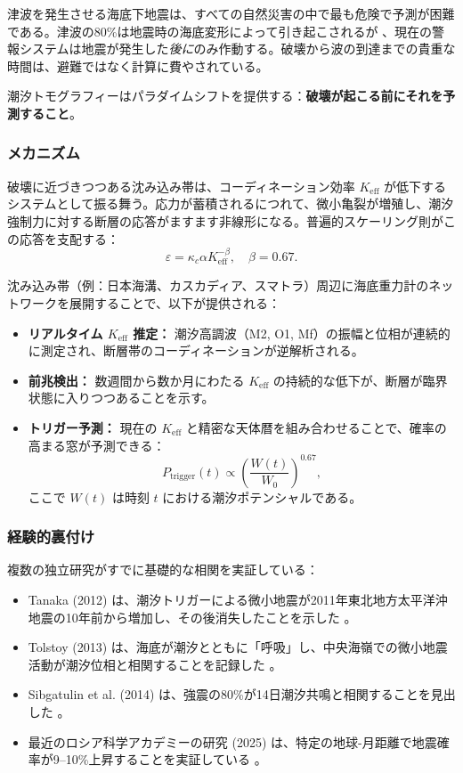 \documentclass[12pt,a4paper]{article}
\theoremstyle{remark}
\begin{document}
	津波を発生させる海底下地震は、すべての自然災害の中で最も危険で予測が困難である。津波の80\%は地震時の海底変形によって引き起こされるが \cite{NOAA2024, USGS2024}、現在の警報システムは地震が発生した\textit{後に}のみ作動する。破壊から波の到達までの貴重な時間は、避難ではなく計算に費やされている。
	
	潮汐トモグラフィーはパラダイムシフトを提供する：\textbf{破壊が起こる前にそれを予測すること}。
	
	\subsubsection{メカニズム}
	
	破壊に近づきつつある沈み込み帯は、コーディネーション効率 \(K_{\mathrm{eff}}\) が低下するシステムとして振る舞う。応力が蓄積されるにつれて、微小亀裂が増殖し、潮汐強制力に対する断層の応答がますます非線形になる。普遍的スケーリング則がこの応答を支配する：
	\[
	\varepsilon = \kappa_c \alpha K_{\mathrm{eff}}^{-\beta}, \quad \beta = 0.67.
	\]
	
	沈み込み帯（例：日本海溝、カスカディア、スマトラ）周辺に海底重力計のネットワークを展開することで、以下が提供される：
	\begin{itemize}
		\item \textbf{リアルタイム \(K_{\mathrm{eff}}\) 推定：} 潮汐高調波（M2, O1, Mf）の振幅と位相が連続的に測定され、断層帯のコーディネーションが逆解析される。
		\item \textbf{前兆検出：} 数週間から数か月にわたる \(K_{\mathrm{eff}}\) の持続的な低下が、断層が臨界状態に入りつつあることを示す。
		\item \textbf{トリガー予測：} 現在の \(K_{\mathrm{eff}}\) と精密な天体暦を組み合わせることで、確率の高まる窓が予測できる：
		\[
		P_{\text{trigger}}(t) \propto \left( \frac{W(t)}{W_0} \right)^{0.67},
		\]
		ここで \(W(t)\) は時刻 \(t\) における潮汐ポテンシャルである。
	\end{itemize}
	
	\subsubsection{経験的裏付け}
	
	複数の独立研究がすでに基礎的な相関を実証している：
	\begin{itemize}
		\item Tanaka (2012) は、潮汐トリガーによる微小地震が2011年東北地方太平洋沖地震の10年前から増加し、その後消失したことを示した \cite{Tanaka2012}。
		\item Tolstoy (2013) は、海底が潮汐とともに「呼吸」し、中央海嶺での微小地震活動が潮汐位相と相関することを記録した \cite{Tolstoy2013}。
		\item Sibgatulin et al. (2014) は、強震の80\%が14日潮汐共鳴と相関することを見出した \cite{Sibgatulin2014}。
		\item 最近のロシア科学アカデミーの研究 (2025) は、特定の地球-月距離で地震確率が9–10\%上昇することを実証している \cite{RAN2025}。
	\end{itemize}
	
\end{document}
